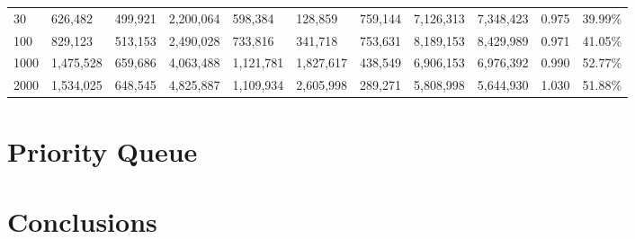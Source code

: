 \begin{landscape}
\begin{table}
\begin{tabularx}{\linewidth}{|X|X|X|X|X|X|X|X|X|X|X|}
                    30 & 626,482 & 499,921 & 2,200,064 & 598,384 & 128,859 & 759,144 & 7,126,313 & 7,348,423 & 0.975 & 39.99\% \\
                    100 & 829,123 & 513,153 & 2,490,028 & 733,816 & 341,718 & 753,631 & 8,189,153 & 8,429,989 & 0.971 & 41.05\% \\
                    1000 & 1,475,528 & 659,686 & 4,063,488 & 1,121,781 & 1,827,617 & 438,549 & 6,906,153 & 6,976,392 & 0.990 & 52.77\% \\
                    2000 & 1,534,025 & 648,545 & 4,825,887 & 1,109,934 & 2,605,998 & 289,271 & 5,808,998 & 5,644,930 & 1.030 & 51.88\% \\
                    \hline
                \end{tabularx}
            \end{table}
        \end{landscape}


    \section{Priority Queue}\label{data_gathering_performance_priority_queue}


    \section{Conclusions}\label{data_gathering_performance_conclusions}

